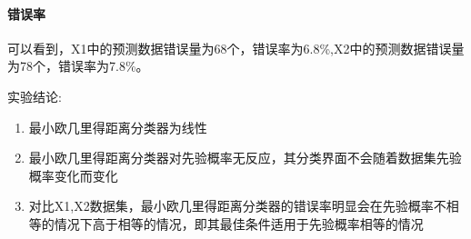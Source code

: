 \documentclass[UTF8]{article} %
\begin{document}
    \paragraph{错误率}  可以看到，X1中的预测数据错误量为68个，错误率为6.8\%,X2中的预测数据错误量为78个，错误率为7.8\%。

    实验结论:
    \begin{enumerate}
        \item 最小欧几里得距离分类器为线性
        \item 最小欧几里得距离分类器对先验概率无反应，其分类界面不会随着数据集先验概率变化而变化
        \item 对比X1,X2数据集，最小欧几里得距离分类器的错误率明显会在先验概率不相等的情况下高于相等的情况，即其最佳条件适用于先验概率相等的情况
    \end{enumerate}
\end{document}
